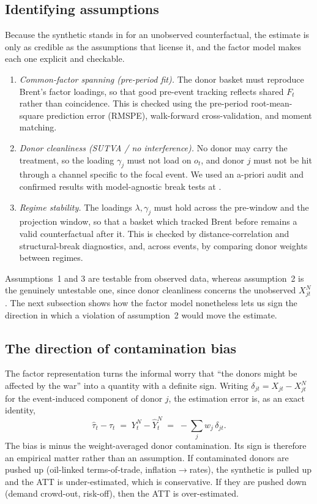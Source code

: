 \subsection{Identifying assumptions}
Because the synthetic stands in for an unobserved counterfactual, the estimate is only as
credible as the assumptions that license it, and the factor model makes each one
explicit and checkable.
\begin{enumerate}
\item \emph{Common-factor spanning (pre-period fit).} The donor basket must reproduce
Brent's factor loadings, so that good pre-event tracking reflects shared $F_t$ rather
than coincidence. This is checked using the pre-period root-mean-square prediction error (RMSPE),
walk-forward cross-validation, and moment matching.
\item \emph{Donor cleanliness (SUTVA / no interference).} No donor may carry the
treatment, so the loading $\gamma_j$ must not load on $o_t$, and donor $j$ must not be hit
through a channel specific to the focal event. We used an a-priori audit and
confirmed results with model-agnostic break tests at \T{}.
\item \emph{Regime stability.} The loadings $\lambda,\gamma_j$ must hold across the
pre-window and the projection window, so that a basket which tracked Brent before \T{}
remains a valid counterfactual after it. This is checked by distance-correlation and
structural-break diagnostics, and, across events, by comparing donor weights between
regimes.
\end{enumerate}
Assumptions~1 and 3 are testable from observed data, whereas assumption~2 is the
genuinely untestable one, since donor cleanliness concerns the unobserved
$X_{jt}^N$. The next subsection shows how the factor model nonetheless lets us sign the
direction in which a violation of assumption~2 would move the estimate.
\subsection{The direction of contamination bias}
The factor representation turns the informal worry that ``the donors might be affected by
the war'' into a quantity with a definite sign. Writing $\delta_{jt}=X_{jt}-X_{jt}^N$ for
the event-induced component of donor $j$, the estimation error is, as an exact identity,
\begin{equation}
\hat\tau_t-\tau_t \;=\; Y_t^N-\hat Y_t^N \;=\; -\sum_j w_j\,\delta_{jt}.
\label{eq:bias}
\end{equation}
The bias is minus the weight-averaged donor contamination. Its sign is therefore
an empirical matter rather than an assumption. If contaminated donors are pushed
up (oil-linked terms-of-trade, inflation$\to$rates), the synthetic is pulled up
and the ATT is under-estimated, which is conservative. If they are pushed
down (demand crowd-out, risk-off), then the ATT is over-estimated.

